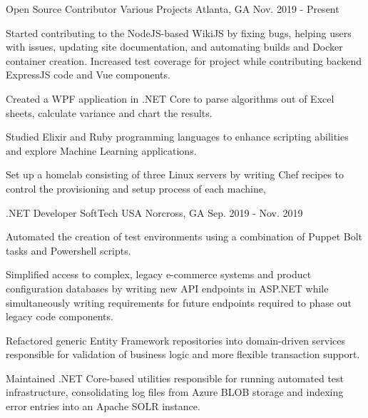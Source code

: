 

\begin{cventries}

\cventry
{Open Source Contributor} %
{Various Projects} %
{Atlanta, GA} %
{Nov. 2019 - Present} %
{
    \begin{cvitems} %
        \item {Started contributing to the NodeJS-based WikiJS by fixing bugs, helping users with issues, updating site documentation, and automating builds and Docker container creation. Increased test coverage for project while contributing backend ExpressJS code and Vue components.}
        \item {Created a WPF application in .NET Core to parse algorithms out of Excel sheets, calculate variance and chart the results. }
        \item {Studied Elixir and Ruby programming languages to enhance scripting abilities and explore Machine Learning applications.}
        \item {Set up a homelab consisting of three Linux servers by writing Chef recipes to control the provisioning and setup process of each machine,}
    \end{cvitems}
}

  \cventry
    {.NET Developer} %
    {SoftTech USA} %
    {Norcross, GA} %
    {Sep. 2019 - Nov. 2019} %
    {
      \begin{cvitems} %
        \item {Automated the creation of test environments using a combination of Puppet Bolt tasks and Powershell scripts.}
        \item {Simplified access to complex, legacy e-commerce systems and product configuration databases by writing new API endpoints in ASP.NET while simultaneously writing requirements for future endpoints required to phase out legacy code components. }
        \item {Refactored generic Entity Framework repositories into domain-driven services responsible for validation of business logic and more flexible transaction support.}
        \item {Maintained .NET Core-based utilities responsible for running automated test infrastructure, consolidating log files from Azure BLOB storage and indexing error entries into an Apache SOLR instance.}
      \end{cvitems}
    }


\end{cventries}
